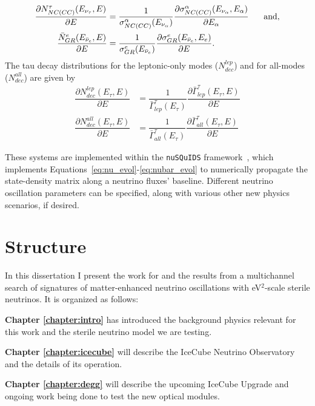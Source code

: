 \documentclass[main.tex]{subfiles}
\begin{document}
\begin{align}
    \dfrac{\partial N_{NC(CC)}^{\tau} (E_{\nu_{\tau}}, E)}{\partial E} &= \dfrac{1}{\sigma_{NC(CC)}^{\alpha} (E_{\nu_{\alpha} })}\dfrac{\partial\sigma_{NC(CC)}^{\alpha}(E_{\nu_{\alpha}}, E_{\alpha})}{\partial E_{\alpha}}\hspace{0.5cm} \text{ and}, \\
    \dfrac{\bar{N}_{GR}^{e} (E_{\bar{\nu}_{e}}, E)}{\partial E} &= \dfrac{1}{\sigma_{GR}^{e}(E_{\bar{\nu}_{e}})} \dfrac{\partial\sigma_{GR}^{e}(E_{\bar{\nu}_{e}}, E_{e})}{\partial E}.
\end{align}
The tau decay distributions for the leptonic-only modes ($N_{dec}^{lep}$) and for all-modes ($N_{dec}^{all}$) are given by 
\begin{align}
    \dfrac{\partial N_{dec}^{lep}(E_{\tau}, E)}{\partial E} &= \dfrac{1}{\bar{\Gamma}_{lep}^{\tau}(E_{\tau})} \dfrac{\partial\bar{\Gamma}_{lep}^{\tau}(E_{\tau},E)}{\partial E} \\
    \dfrac{\partial N_{dec}^{all}(E_{\tau}, E)}{\partial E} &= \dfrac{1}{\bar{\Gamma}_{all}^{\tau}(E_{\tau})} \dfrac{\partial\bar{\Gamma}_{all}^{\tau}(E_{\tau},E)}{\partial E} 
\end{align}

These systems are implemented within the \texttt{nuSQuIDS} framework~\cite{arguelles:2015nu, arguelles2021nusquids}, which implements Equations~\eqref{eq:nu_evol}-\eqref{eq:nubar_evol} to numerically propagate the state-density matrix along a neutrino fluxes' baseline. 
Different neutrino oscillation parameters can be specified, along with various other new physics scenarios, if desired.

\section{Structure}

In this dissertation I present the work for and the results from a multichannel search of signatures of matter-enhanced neutrino oscillations with eV$^{2}$-scale sterile neutrinos. 
It is organized as follows:

\textbf{Chapter \ref{chapter:intro}} has introduced the background physics relevant for this work and the sterile neutrino model we are testing.

\textbf{Chapter \ref{chapter:icecube}} will describe the IceCube Neutrino Observatory and the details of its operation. 

\textbf{Chapter \ref{chapter:degg}} will describe the upcoming IceCube Upgrade and ongoing work being done to test the new optical modules.
\end{document}

